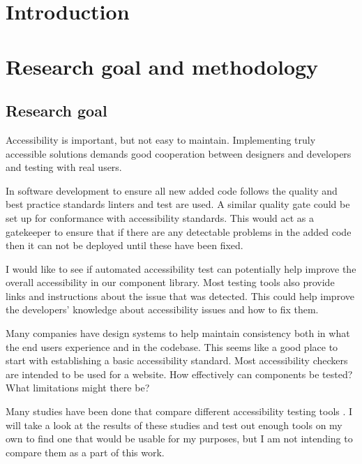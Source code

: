 \documentclass{master_thesis}
\begin{document}
\tableofcontents

\section*{Introduction}

\section{Research goal and methodology}
	\subsection{Research goal}
Accessibility is important, but not easy to maintain. Implementing truly accessible solutions demands good cooperation between designers and developers and testing with real users.

In software development to ensure all new added code follows the quality and best practice standards linters and test are used. A similar quality gate could be set up for conformance with accessibility standards. This would act as a gatekeeper to ensure that if there are any detectable problems in the added code then it can not be deployed until these have been fixed.

I would like to see if automated accessibility test can potentially help improve the overall accessibility in our component library. Most testing tools also provide links and instructions about the issue that was detected. This could help improve the developers' knowledge about accessibility issues and how to fix them.

Many companies have design systems to help maintain consistency both in what the end users experience and in the codebase. This seems like a good place to start with establishing a basic accessibility standard. Most accessibility checkers are intended to be used for a website. How effectively can components be tested? What limitations might there be?

Many studies have been done that compare different accessibility testing tools \citep{Alsaeedi2020,Ismailova2022,Sane2021,Vigo2013,RybinKoob2022}. I will take a look at the results of these studies and test out enough tools on my own to find one that would be usable for my purposes, but I am not intending to compare them as a part of this work.
\end{document}

